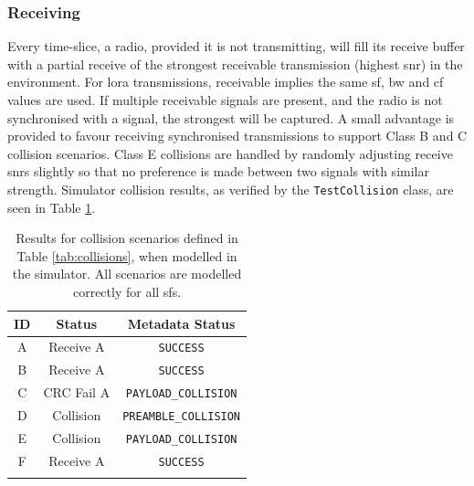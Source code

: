 \subsubsection{Receiving}
Every time-slice, a radio, provided it is not transmitting, will fill its receive buffer with a partial receive of the strongest receivable transmission (highest \ac{snr}) in the environment. For \ac{lora} transmissions, receivable implies the same \ac{sf}, \ac{bw} and \ac{cf} values are used. If multiple receivable signals are present, and the radio is not synchronised with a signal, the strongest will be captured. A small advantage is provided to favour receiving synchronised transmissions to support Class B and C collision scenarios. Class E collisions are handled by randomly adjusting receive \ac{snr}s slightly so that no preference is made between two signals with similar strength. Simulator collision results, as verified by the \texttt{TestCollision} class, are seen in Table  \ref{tab:sim_collisions}.

\begin{table}[H]
\centering\small
\caption[Simulator results for collision scenarios]{Results for collision scenarios defined in Table \ref{tab:collisions}, when modelled in the simulator. All scenarios are modelled correctly for all \ac{sf}s.}
\begin{tabular}{c|c|c}
    \toprule
    \textbf{ID} & \textbf{Status} & \textbf{Metadata Status}\\
    \midrule\addlinespace
    A & Receive A &  \cellcolor{green!25}\texttt{SUCCESS} \\
    B & Receive A &  \cellcolor{green!25}\texttt{SUCCESS} \\
    C & CRC Fail A &  \cellcolor{green!25}\texttt{PAYLOAD\_COLLISION}  \\
    D & Collision &  \cellcolor{green!25}\texttt{PREAMBLE\_COLLISION} \\
    E & Collision &  \cellcolor{green!25}\texttt{PAYLOAD\_COLLISION}  \\
    F & Receive A &  \cellcolor{green!25}\texttt{SUCCESS} \\
    \addlinespace\bottomrule
\end{tabular}
\label{tab:sim_collisions}
\end{table}

